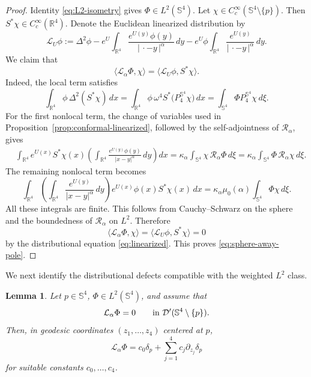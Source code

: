 \documentclass[11pt]{article}
\newtheorem{lemma}[theorem]{Lemma}
\numberwithin{equation}{section}
\begin{document}
\begin{proof}
Identity \eqref{eq:L2-isometry} gives \(\Phi\in L^{2}(\mathbb S^{4})\). Let
\(\chi\in C_{c}^{\infty}(\mathbb S^{4}\setminus\{p\})\). Then
\(S^{*}\chi\in C_{c}^{\infty}(\mathbb R^{4})\). Denote the Euclidean
linearized distribution by
\[
\mathscr L_{U}\phi
:=
\Delta^{2}\phi
-e^{U}\int_{\mathbb R^{4}}
\frac{e^{U(y)}\phi(y)}{|\,\cdot-y\,|^{\alpha}}\,dy
-e^{U}\phi\int_{\mathbb R^{4}}
\frac{e^{U(y)}}{|\,\cdot-y\,|^{\alpha}}\,dy.
\]
We claim that
\[
\langle\mathcal L_{\alpha}\Phi,\chi\rangle
=
\langle\mathscr L_{U}\phi,S^{*}\chi\rangle.
\]
Indeed, the local term satisfies
\[
\int_{\mathbb R^{4}}\phi\,\Delta^{2}(S^{*}\chi)\,dx
=
\int_{\mathbb R^{4}}\phi\,\omega^{4}
S^{*}\bigl(P_{4}^{\mathbb S^{4}}\chi\bigr)\,dx
=
\int_{\mathbb S^{4}}\Phi P_{4}^{\mathbb S^{4}}\chi\,d\xi.
\]
For the first nonlocal term, the change of variables used in
Proposition~\ref{prop:conformal-linearized}, followed by the self-adjointness
of \(\mathcal R_{\alpha}\), gives
\[
\begin{aligned}
&\int_{\mathbb R^{4}}e^{U(x)}S^{*}\chi(x)
\left(\int_{\mathbb R^{4}}
\frac{e^{U(y)}\phi(y)}{|x-y|^{\alpha}}\,dy\right)dx
=\kappa_{\alpha}
\int_{\mathbb S^{4}}\chi\,\mathcal R_{\alpha}\Phi\,d\xi
=\kappa_{\alpha}
\int_{\mathbb S^{4}}\Phi\,\mathcal R_{\alpha}\chi\,d\xi.
\end{aligned}
\]
The remaining nonlocal term becomes
\[
\int_{\mathbb R^{4}}
\left(\int_{\mathbb R^{4}}
\frac{e^{U(y)}}{|x-y|^{\alpha}}\,dy\right)
e^{U(x)}\phi(x)S^{*}\chi(x)\,dx
=
\kappa_{\alpha}\mu_{0}(\alpha)
\int_{\mathbb S^{4}}\Phi\chi\,d\xi.
\]
All these integrals are finite. This follows from Cauchy--Schwarz on the
sphere and the boundedness of \(\mathcal R_{\alpha}\) on \(L^{2}\). Therefore
\[
\langle\mathcal L_{\alpha}\Phi,\chi\rangle
=
\langle\mathscr L_{U}\phi,S^{*}\chi\rangle=0
\]
by the distributional equation \eqref{eq:linearized}. This proves
\eqref{eq:sphere-away-pole}.
\end{proof}

We next identify the distributional defects compatible with the weighted \(L^{2}\) class.

\begin{lemma}\label{lem:pole-defect}
Let \(p\in\mathbb S^{4}\), \(\Phi\in L^{2}(\mathbb S^{4})\), and assume that
\[
\mathcal L_{\alpha}\Phi=0
\qquad\hbox{in }\mathcal D'(\mathbb S^{4}\setminus\{p\}).
\]
Then, in geodesic coordinates \((z_{1},\ldots,z_{4})\) centered at \(p\),
\begin{equation}\label{eq:defect-form}
\mathcal L_{\alpha}\Phi
=c_{0}\delta_{p}+\sum_{j=1}^{4}c_{j}\partial_{z_{j}}\delta_{p}
\end{equation}
for suitable constants \(c_{0},\ldots,c_{4}\).
\end{lemma}
\end{document}
